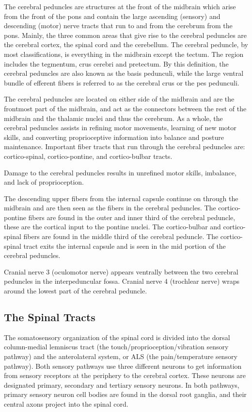 The cerebral peduncles are structures at the front of the midbrain which arise from the front of the pons and contain the large ascending (sensory) and descending (motor) nerve tracts that run to and from the cerebrum from the pons. Mainly, the three common areas that give rise to the cerebral peduncles are the cerebral cortex, the spinal cord and the cerebellum. The cerebral peduncle, by most classifications, is everything in the midbrain except the tectum. The region includes the tegmentum, crus cerebri and pretectum. By this definition, the cerebral peduncles are also known as the basis pedunculi, while the large ventral bundle of efferent fibers is referred to as the cerebral crus or the pes pedunculi.

The cerebral peduncles are located on either side of the midbrain and are the frontmost part of the midbrain, and act as the connectors between the rest of the midbrain and the thalamic nuclei and thus the cerebrum. As a whole, the cerebral peduncles assists in refining motor movements, learning of new motor skills, and converting proprioceptive information into balance and posture maintenance. Important fiber tracts that run through the cerebral peduncles are: cortico-spinal, cortico-pontine, and cortico-bulbar tracts.

Damage to the cerebral peduncles results in unrefined motor skills, imbalance, and lack of proprioception.

The descending upper fibers from the internal capsule continue on through the midbrain and are then seen as the fibers in the cerebral peduncles. The cortico-pontine fibers are found in the outer and inner third of the cerebral peduncle, these are the cortical input to the pontine nuclei. The cortico-bulbar and cortico-spinal fibers are found in the middle third of the cerebral peduncle. The cortico-spinal tract exits the internal capsule and is seen in the mid portion of the cerebral peduncles.

Cranial nerve 3 (oculomotor nerve) appears ventrally between the two cerebral peduncles in the interpeduncular fossa. Cranial nerve 4 (trochlear nerve) wraps around the lowest part of the cerebral peduncle.

\hypertarget{the-spinal-tracts}{%
\subsection{The Spinal Tracts}\label{the-spinal-tracts}}

The somatosensory organization of the spinal cord is divided into the dorsal column-medial lemniscus tract (the touch/proprioception/vibration sensory pathway) and the anterolateral system, or ALS (the pain/temperature sensory pathway). Both sensory pathways use three different neurons to get information from sensory receptors at the periphery to the cerebral cortex. These neurons are designated primary, secondary and tertiary sensory neurons. In both pathways, primary sensory neuron cell bodies are found in the dorsal root ganglia, and their central axons project into the spinal cord.

